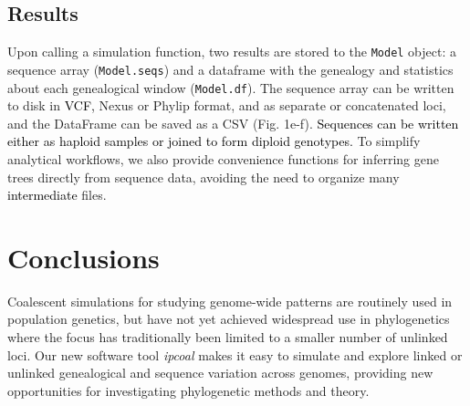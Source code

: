 \documentclass[11pt]{article}
\begin{document}
\subsection{Results}
Upon calling a simulation function, two results are stored to the \texttt{Model} object: a sequence array (\texttt{Model.seqs}) and a dataframe with the genealogy and statistics about each genealogical window (\texttt{Model.df}). The sequence array can be written to disk in \textcolor{black}{VCF,} Nexus or Phylip format, and as separate or concatenated loci, and the DataFrame can be saved as a CSV (Fig. 1e-f). \textcolor{black}{Sequences can be written either as haploid samples or joined to form diploid genotypes.} To simplify analytical workflows, we also provide convenience functions for inferring gene trees directly from sequence data, avoiding the need to organize many \textcolor{black}{intermediate} files.

\section{Conclusions}
\label{sec:conclusions}
Coalescent simulations for studying genome-wide patterns are routinely used in population genetics, but have not yet achieved widespread use in phylogenetics where the focus has traditionally been limited to a smaller number of unlinked loci. Our new software tool \emph{ipcoal} makes it easy to simulate and explore linked or unlinked genealogical and sequence variation across genomes, providing new opportunities for investigating phylogenetic methods and theory.
\end{document}

